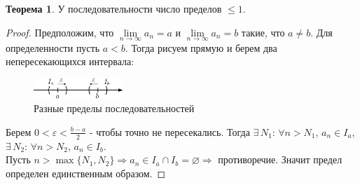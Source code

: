 \documentclass[12pt]{article}
\theoremstyle{definition}
\newtheorem{theorem}{Теорема}
\begin{document}
\begin{theorem}
	У последовательности число пределов $\leq 1$.
\end{theorem}

\begin{proof}
	Предположим, что $\lim\limits_{n \rightarrow \infty}{a_n} = a$ и $\lim\limits_{n \rightarrow \infty}{a_n} = b$ такие, что $a \neq b$. Для определенности пусть $a < b$. Тогда рисуем прямую и берем два непересекающихся интервала:
	
 	\begin{figure}[H]
		\centering
		\includegraphics[width=0.3\textwidth]{7_6.eps}
		\caption{Разные пределы последовательностей}
		\label{fig:7_6}
	\end{figure}
	
Берем $0 < \varepsilon < \frac{b-a}{2}$ - чтобы точно не пересекались. Тогда $\exists \, N_1 \colon \, \forall n > N_1, \, a_n \in I_a$, $\exists \, N_2 \colon \, \forall n > N_2, \, a_n \in I_b$.\\
Пусть $n > \max \{N_1, N_2\} \Rightarrow a_n \in I_a \cap I_b = \varnothing \Rightarrow$ противоречие. Значит предел определен единственным образом.
\end{proof}
\end{document}
